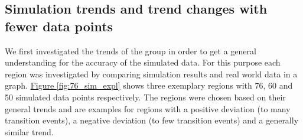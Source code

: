\subsection{Simulation trends and trend changes with fewer data points}
We first investigated the trends of the  group in order to get a general understanding for the accuracy of the simulated
data. For this purpose each region was investigated by comparing simulation results and real world data in a graph.
\hyperref[fig:76_sim_expl]{Figure \ref*{fig:76_sim_expl}} shows three exemplary regions with 76, 60 and 50 simulated data
points respectively. The regions were chosen based on their general trends and are examples for regions with a positive deviation
(to many transition events), a negative deviation (to few transition events) and a generally similar trend.\newline

